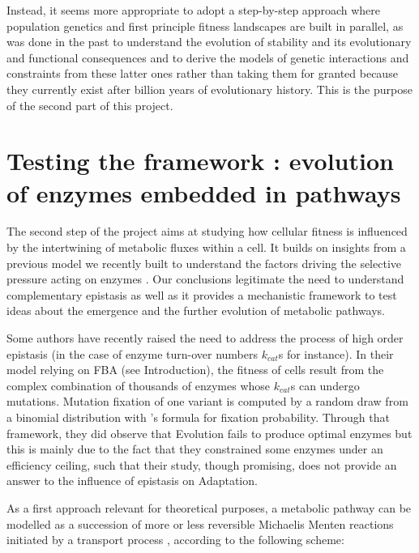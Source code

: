 \documentclass[11pt,onecolumn]{article}
\begin{document}
Instead, it seems more appropriate to adopt a step-by-step approach where population genetics and first principle fitness landscapes are built in parallel, as was done in the past to understand the evolution of stability and its evolutionary and functional consequences \citep{Taverna02,Bloom04,Bloom06,Bloom07,Drummond05,Drummond08,Serohijos12,Dasmeh14,Echave17a,Dasmeh18} and to derive the models of genetic interactions and constraints from these latter ones rather than taking them for granted because they currently exist after billion years of evolutionary history. This is the purpose of the second part of this project.

\section{{Testing the framework : evolution of enzymes embedded in pathways}\label{sec:TFEE}}

The second step of the project aims at studying how cellular fitness is influenced by the intertwining of metabolic fluxes within a cell. It builds on insights from a previous model we recently built to understand the factors driving the selective pressure acting on enzymes \citep{Labourel20}. Our conclusions legitimate the need to understand complementary epistasis as well as it provides a mechanistic framework to test ideas about the emergence and the further evolution of metabolic pathways.

Some authors \citep{Heckmann18} have recently raised the need to address the process of high order epistasis (in
the case of enzyme turn-over numbers \(k_{cat}\)s for instance). In their model relying on FBA (see Introduction), the fitness of cells result from the complex combination of thousands of enzymes whose \(k_{cat}\)s can undergo mutations. Mutation fixation of one variant is computed by a random draw from a binomial distribution with \citet{Kimura62}'s formula for fixation probability. Through that framework, they did observe that Evolution fails to produce optimal enzymes but this is mainly due to the fact that they constrained some enzymes under an efficiency ceiling, such that their study, though promising, does not provide an answer to the influence of epistasis on Adaptation.

As a first approach relevant for theoretical purposes, a metabolic pathway can be modelled as a succession of more or less reversible Michaelis Menten reactions initiated by a transport process \citep{Labourel20}, according to the following scheme:  
\end{document}
